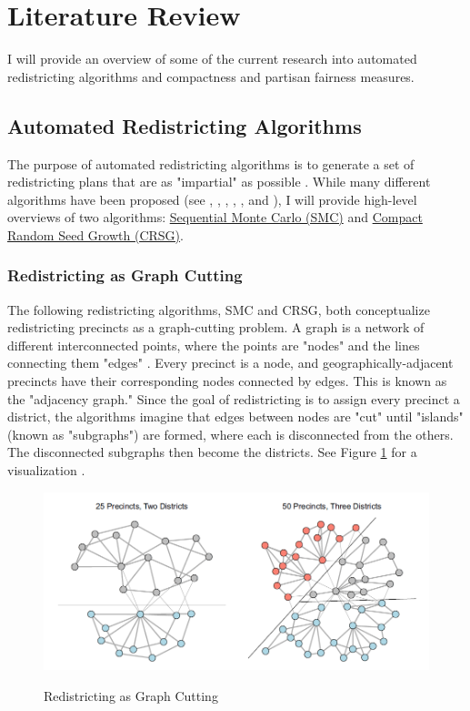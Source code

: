 \section{Literature Review}
\label{sec:litreview}

I will provide an overview of some of the current research into automated redistricting algorithms and compactness and partisan fairness measures. 

\subsection{Automated Redistricting Algorithms}

The purpose of automated redistricting algorithms is to generate a set of redistricting plans that are as "impartial" as possible \parencite{chen2013}. While many different algorithms have been proposed (see \textcite{altman2009}, \textcite{haas2020}, \textcite{lara-caballero2019}, \textcite{macmillan2001}, \textcite{weaver1963}, and \textcite{xiao2008}), I will provide high-level overviews of two algorithms: \hyperref[sec:smc]{Sequential Monte Carlo (SMC)} and \hyperref[sec:crsg]{Compact Random Seed Growth (CRSG)}. 

\subsubsection{Redistricting as Graph Cutting}
\label{sec:redistasgraphcut}


The following redistricting algorithms, SMC and CRSG, both conceptualize redistricting precincts as a graph-cutting problem. A graph is a network of different interconnected points, where the points are "nodes" and the lines connecting them "edges" \parencite{fifield2020}. Every precinct is a node, and geographically-adjacent precincts have their corresponding nodes connected by edges. This is known as the "adjacency graph." Since the goal of redistricting is to assign every precinct a district, the algorithms imagine that edges between nodes are "cut" until "islands" (known as "subgraphs") are formed, where each is disconnected from the others. The disconnected subgraphs then become the districts. See Figure \ref{fig:graphcut} for a visualization \parencite{fifield2020}. 

\begin{figure}[ht]
    \caption{Redistricting as Graph Cutting}
    \includegraphics[width=0.8\linewidth]{img/graphcut.png}
    \label{fig:graphcut}
    \raggedright
\end{figure} 

